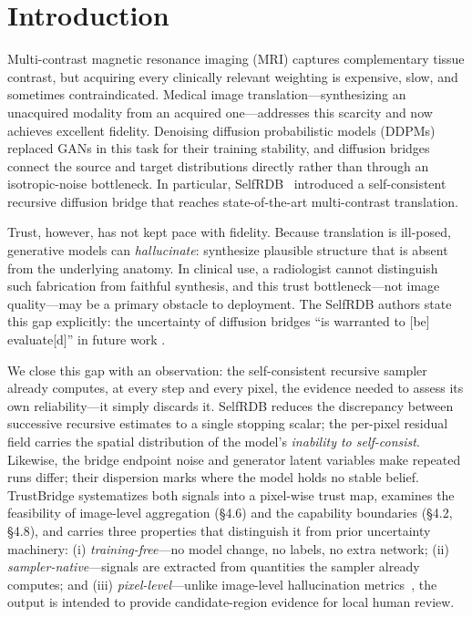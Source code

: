 \documentclass[11pt]{article}
\newcommand{\TrustMap}{trust map}
\begin{document}
\section{Introduction}
\label{sec:intro}
Multi-contrast magnetic resonance imaging (MRI) captures complementary tissue
contrast, but acquiring every clinically relevant weighting is expensive, slow,
and sometimes contraindicated. Medical image translation---synthesizing an
unacquired modality from an acquired one---addresses this scarcity and now
achieves excellent fidelity. Denoising diffusion probabilistic models
(DDPMs)~\cite{ho2020ddpm,nichol2021iddpm} replaced GANs in this task for their
training stability, and diffusion bridges connect the source and target
distributions directly rather than through an isotropic-noise bottleneck. In
particular, SelfRDB~\cite{arslan2025selfrdb} introduced a self-consistent
recursive diffusion bridge that reaches state-of-the-art multi-contrast
translation.

Trust, however, has not kept pace with fidelity. Because translation is
ill-posed, generative models can \emph{hallucinate}: synthesize plausible
structure that is absent from the underlying anatomy. In clinical use, a
radiologist cannot distinguish such fabrication from faithful synthesis, and
this trust bottleneck---not image quality---may be a primary obstacle to
deployment. The SelfRDB authors state this gap explicitly: the uncertainty of
diffusion bridges ``is warranted to [be] evaluate[d]'' in future work
\cite{arslan2025selfrdb}.

We close this gap with an observation: the self-consistent recursive sampler
already computes, at every step and every pixel, the evidence needed to assess
its own reliability---it simply discards it. SelfRDB reduces the discrepancy
between successive recursive estimates to a single stopping scalar; the
per-pixel residual field carries the spatial distribution of the model's
\emph{inability to self-consist}. Likewise, the bridge endpoint noise and
generator latent variables make repeated runs differ; their dispersion marks
where the model holds no stable belief. TrustBridge systematizes both signals
into a pixel-wise \TrustMap{}, examines the feasibility of image-level
aggregation (\S4.6) and the capability boundaries (\S4.2, \S4.8), and carries
three properties that distinguish it from prior uncertainty machinery:
(i) \emph{training-free}---no model change, no labels, no extra network;
(ii) \emph{sampler-native}---signals are extracted from quantities the sampler
already computes; and (iii) \emph{pixel-level}---unlike image-level
hallucination metrics~\cite{tivnan2024hallucinationindex}, the output is
intended to provide candidate-region evidence for local human review.
\end{document}
